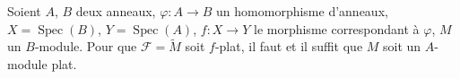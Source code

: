 \begin{proposition}[2.1.2]
\label{IV.2.1.2-fr}
Soient $A$, $B$ deux anneaux, $\varphi:A\to B$ un homomorphisme d'anneaux,
$X=\operatorname{Spec}(B)$, $Y=\operatorname{Spec}(A)$, $f:X\to Y$ le
morphisme correspondant à $\varphi$, $M$ un $B$-module. Pour que
$\mathscr F=\widetilde M$ soit $f$-plat, il faut et il suffit que $M$ soit un
$A$-module plat.
\end{proposition}


